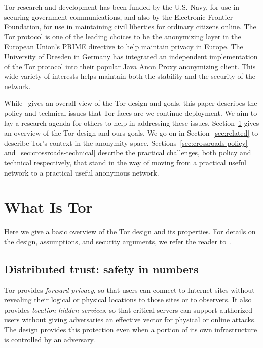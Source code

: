 \documentclass{llncs}
\begin{document}
Tor research and development has been funded by the U.S. Navy, for use
in securing government
communications, and also by the Electronic Frontier Foundation, for use
in maintaining civil liberties for ordinary citizens online. The Tor
protocol is one of the leading choices
to be the anonymizing layer in the European Union's PRIME directive to
help maintain privacy in Europe. The University of Dresden in Germany
has integrated an independent implementation of the Tor protocol into
their popular Java Anon Proxy anonymizing client. This wide variety of
interests helps maintain both the stability and the security of the
network.

While~\cite{tor-design} gives an overall view of the Tor design and goals,
this paper describes the policy and technical issues that Tor faces are
we continue deployment. We aim to lay a research agenda for others to
help in addressing these issues. Section~\ref{sec:what-is-tor} gives an
overview of the Tor
design and ours goals. We go on in Section~\ref{sec:related} to describe
Tor's context in the anonymity space. Sections~\ref{sec:crossroads-policy}
and~\ref{sec:crossroads-technical} describe the practical challenges,
both policy and technical respectively, that stand in the way of moving
from a practical useful network to a practical useful anonymous network.

\section{What Is Tor}
\label{sec:what-is-tor}

Here we give a basic overview of the Tor design and its properties. For
details on the design, assumptions, and security arguments, we refer
the reader to~\cite{tor-design}.

\subsection{Distributed trust: safety in numbers}

Tor provides \emph{forward privacy}, so that users can connect to
Internet sites without revealing their logical or physical locations
to those sites or to observers.  It also provides \emph{location-hidden
services}, so that critical servers can support authorized users without
giving adversaries an effective vector for physical or online attacks.
The design provides this protection even when a portion of its own
infrastructure is controlled by an adversary.
\end{document}
